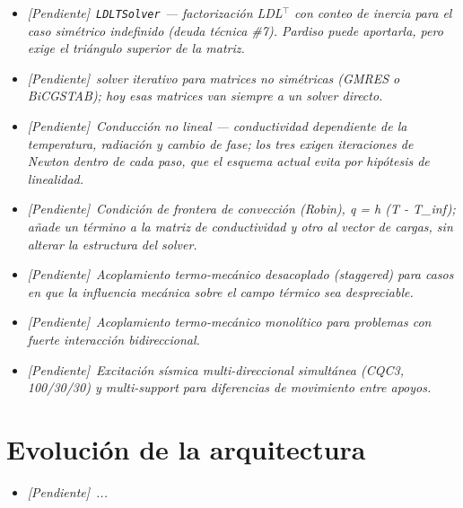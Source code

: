 \documentclass[11pt,oneside]{report}
\newcommand{\pendiente}[1]{\textcolor{pendienteorange}{\textit{[Pendiente]}~\textcolor{pendienteorange}{\textit{#1}}}}
\begin{document}
\begin{itemize}
  \item \pendiente{\texttt{LDLTSolver} --- factorización LDL\ensuremath{^{\top}} con conteo de inercia para el caso simétrico indefinido (deuda técnica \#7). Pardiso puede aportarla, pero exige el triángulo superior de la matriz.}

  \item \pendiente{solver iterativo para matrices no simétricas (GMRES o BiCGSTAB); hoy esas matrices van siempre a un solver directo.}

  \item \pendiente{Conducción no lineal --- conductividad dependiente de la temperatura, radiación y cambio de fase; los tres exigen iteraciones de Newton dentro de cada paso, que el esquema actual evita por hipótesis de linealidad.}

  \item \pendiente{Condición de frontera de convección (Robin), q = h (T - T\_inf); añade un término a la matriz de conductividad y otro al vector de cargas, sin alterar la estructura del solver.}

  \item \pendiente{Acoplamiento termo-mecánico desacoplado (staggered) para casos en que la influencia mecánica sobre el campo térmico sea despreciable.}

  \item \pendiente{Acoplamiento termo-mecánico monolítico para problemas con fuerte interacción bidireccional.}

  \item \pendiente{Excitación sísmica multi-direccional simultánea (CQC3, 100/30/30) y multi-support para diferencias de movimiento entre apoyos.}

\end{itemize}


\section*{Evolución de la arquitectura}


\begin{itemize}

  \item \pendiente{...}

\end{itemize}


\newpage
\end{document}
